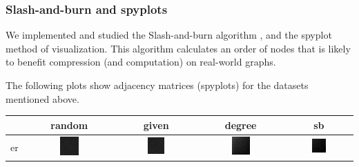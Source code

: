 \documentclass{article}
\begin{document}
\subsubsection*{Slash-and-burn and spyplots}

We implemented and studied the Slash-and-burn algorithm \cite{kang2011beyond}, and the spyplot method of visualization. This algorithm calculates an order of nodes that is likely to benefit compression (and computation) on real-world graphs.

The following plots show adjacency matrices (spyplots) for the datasets mentioned above.

\begin{table}[h]
\begin{tabular}{l | c c c c}
\hline
 & random & given & degree & sb \\
\hline
er
&
    \includegraphics[width=0.23\textwidth]{../img/er/adjacency-matrix-random-ordering.png}
& 
    \includegraphics[width=0.23\textwidth]{../img/er/adjacency-matrix-given-ordering.png}
& 
    \includegraphics[width=0.23\textwidth]{../img/er/adjacency-matrix-degree-ordering.png}
& 
    \includegraphics[width=0.23\textwidth]{../img/er/adjacency-matrix-slashburn-ordering.png} \\


\end{tabular}
\end{table}
\end{document}
